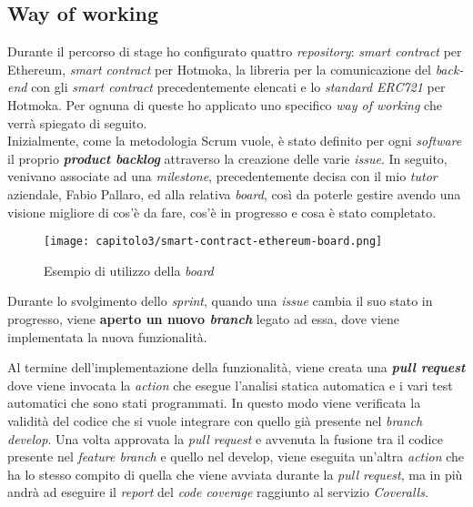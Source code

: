 
\subsection{Way of working}
Durante il percorso di stage ho configurato quattro \textit{repository}: \textit{smart contract} per Ethereum, \textit{smart contract} per Hotmoka, la libreria per la comunicazione del \textit{back-end} con gli \textit{smart contract} precedentemente elencati e lo \textit{standard ERC721} per Hotmoka. Per ognuna di queste ho applicato uno specifico \textit{way of working} che verrà spiegato di seguito. \\

Inizialmente, come la metodologia Scrum vuole, è stato definito per ogni \textit{software} il proprio \textbf{\textit{product backlog}} attraverso la creazione delle varie \textit{issue}. In seguito, venivano associate ad una \textit{milestone}, precedentemente decisa con il mio \textit{tutor} aziendale, Fabio Pallaro, ed alla relativa \textit{board}, così da poterle gestire avendo una visione migliore di cos'è da fare, cos'è in progresso e cosa è stato completato.

\begin{figure}[h!]
  \centering
  \texttt{[image: capitolo3/smart-contract-ethereum-board.png]}
  \caption{Esempio di utilizzo della \textit{board}}
\end{figure}

Durante lo svolgimento dello \textit{sprint}, quando una \textit{issue} cambia il suo stato in progresso, viene \textbf{aperto un nuovo \textit{branch}} legato ad essa, dove viene implementata la nuova funzionalità.

Al termine dell'implementazione della funzionalità, viene creata una \textbf{\textit{pull request}} dove viene invocata la \textit{action} che esegue l'analisi statica automatica e i vari test automatici che sono stati programmati. In questo modo viene verificata la validità del codice che si vuole integrare con quello già presente nel \textit{branch develop}. Una volta approvata la \textit{pull request} e avvenuta la fusione tra il codice presente nel \textit{feature branch} e quello nel develop, viene eseguita un'altra \textit{action} che ha lo stesso compito di quella che viene avviata durante la \textit{pull request}, ma in più andrà ad eseguire il \textit{report} del \textit{code coverage} raggiunto al servizio \textit{Coveralls}.


